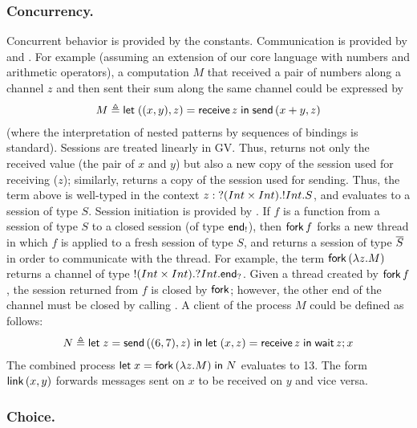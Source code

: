 \documentclass[oribibl,orivec,envcountsame]{llncs}
\begin{document}
\subsubsection{Concurrency.}

Concurrent behavior is provided by the constants.  Communication is provided by  and
.  For example (assuming an extension of our core language with numbers and
arithmetic operators), a computation $M$ that received a pair of numbers along a channel $z$ and then
sent their sum along the same channel could be expressed by
%
\[
M \defeq
  \bl
    \gvlet{((x, y), z)}{\gvreceive{z}}
    {\gvsend{(x + y,z)}}
  \el
\]
%
(where the interpretation of nested patterns by sequences of bindings is standard).  Sessions are
treated linearly in GV. Thus,  returns not only the received value (the pair of $x$
and $y$) but also a new copy of the session used for receiving ($z$); similarly, 
returns a copy of the session used for sending. Thus, the term above is well-typed in the context $z
: {?(Int \times Int).{!Int.S}}$, and evaluates to a session of type $S$. Session
initiation is provided by . If $f$ is a function from a session of type $S$ to a
closed session (of type $\mathsf{end}_!$), then $\mathsf{fork} \, f$ forks a new thread in which $f$
is applied to a fresh session of type $S$, and returns a session of type $\overline{S}$ in order to
communicate with the thread. For example, the term $\mathsf{fork} \, (\lambda z. M)$ returns a
channel of type ${!(Int \times Int).{?Int.\mathsf{end}_?}}$. Given a thread created by
$\mathsf{fork} \, f$, the session returned from $f$ is closed by $\mathsf{fork}$; however, the
other end of the channel must be closed by calling . A client of the process $M$ could
be defined as follows:
%
\[N \defeq
  \bl
  \gvlet{z}{\gvsend{((6,7),z)}}
  {\gvlet{(x,z)}{\gvreceive{z}}}
  {\gvletunit{\gvconst{wait}\app z}{x}}
\el\]
%
The combined process $\mathsf{let}\;x = \mathsf{fork}\,(\lambda z.M)\;\mathsf{in}\;N$ evaluates to 13. The form
$\mathsf{link} \, (x, y)$ forwards messages sent on $x$ to be received on $y$ and vice versa.

\subsubsection{Choice.}
\end{document}
